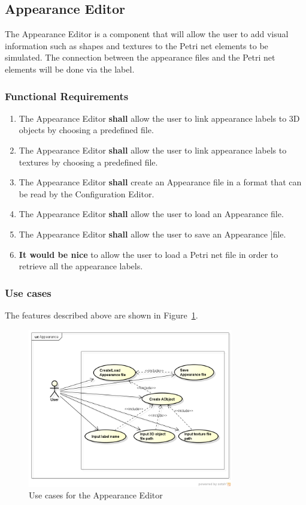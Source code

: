 \subsection{Appearance Editor}
\label{sec:sf-appearance}

The Appearance Editor is a component that will allow the user to add visual information such as shapes and textures to the Petri net elements to be simulated. The connection between the appearance files and the Petri net elements will be done via the \texappearance label. 

\subsubsection{Functional Requirements}

\begin{enumerate}
\item The Appearance Editor \textbf{shall} allow the user to link appearance labels to 3D objects by choosing a predefined file.
\item The Appearance Editor \textbf{shall} allow the user to link appearance labels to textures by choosing a predefined file.
\item The Appearance Editor \textbf{shall} create an Appearance file in a format that can be read by the Configuration Editor.
\item The Appearance Editor \textbf{shall} allow the user to load an Appearance file.
\item The Appearance Editor \textbf{shall} allow the user to save an Appearance ]file.
\item \textbf{It would be nice} to allow the user to load a Petri net file in order to retrieve all the appearance labels.     
\end{enumerate}

\subsubsection{Use cases}

The features described above are shown in Figure~\ref{fig:use-cases-appearance-editor}.

\begin{figure}[htp]
\begin{center}
  \includegraphics[width=0.8\textwidth]{image/uc-appearance.png}
  \caption{Use cases for the Appearance Editor}
  \label{fig:use-cases-appearance-editor}
\end{center}
\end{figure}

